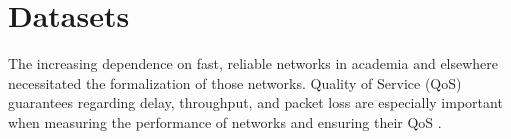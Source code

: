 \section{Datasets}
The increasing dependence on fast, reliable networks in academia and elsewhere necessitated the formalization of those networks. Quality of Service (QoS) guarantees regarding delay, throughput, and packet loss are especially important when measuring the performance of networks and ensuring their QoS \cite{10.1007/978-3-030-15986-3_19}.